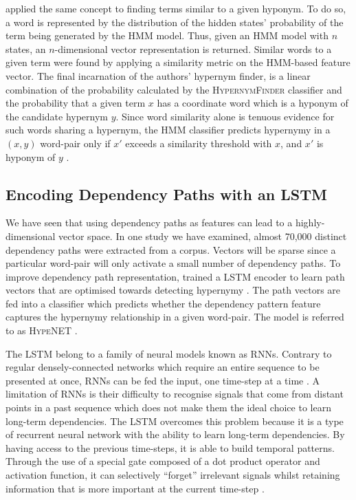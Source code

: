 \citeauthor{ritter2009anyway} applied the same concept to finding terms similar to a given hyponym.  To do so, a word is represented by the distribution of the hidden states’ probability of the term being generated by the \ac{HMM} model.  Thus, given an \ac{HMM} model with $n$ states, an $n$-dimensional vector representation is returned.  Similar words to a given term were found by applying a similarity metric on the \ac{HMM}-based feature vector.  The final incarnation of the authors' hypernym finder, is a linear combination of the probability calculated by the \textsc{HypernymFinder} classifier and the probability that a given term $x$ has a coordinate word which is a hyponym of the candidate hypernym $y$. Since word similarity alone is tenuous evidence for such words sharing a hypernym, the \ac{HMM} classifier predicts hypernymy in a $(x, y)$ word-pair only if $x'$ exceeds a similarity threshold with $x$, and $x'$ is hyponym of $y$ \citep{ritter2009anyway}.

\subsection{Encoding Dependency Paths with an LSTM} \label{HypeNet}
We have seen that using dependency paths as features can lead to a highly-dimensional vector space.  In one study we have examined, almost 70,000 distinct dependency paths were extracted from a corpus.  Vectors will be sparse since a particular word-pair will only activate a small number of dependency paths.  To improve dependency path representation, \citeauthor{shwartz2016path} trained a \ac{LSTM} \citep{hochreiter1997long} encoder to learn path vectors that are optimised towards detecting hypernymy \citep{shwartz2016path}.  The path vectors are fed into a classifier which predicts whether the dependency pattern feature captures the hypernymy relationship in a given word-pair.  The model is referred to as \textsc{HypeNET} \citep{shwartz2016path}.

The LSTM belong to a family of neural models known as \ac{RNN}s.  Contrary to regular densely-connected networks which require an entire sequence to be presented at once, \ac{RNN}s can be fed the input, one time-step at a time \citep{chollet2017deep}.  A limitation of \ac{RNN}s is their difficulty to recognise signals that come from distant points in a past sequence which does not make them the ideal choice to learn long-term dependencies.  The \ac{LSTM} overcomes this problem because it is a type of recurrent neural network with the ability to learn long-term dependencies.  By having access to the previous time-steps, it is able to build temporal patterns.  Through the use of a special gate composed of a dot product operator and activation function, it can selectively “forget” irrelevant signals whilst retaining information that is more important at the current time-step \citep{chollet2017deep}.  

